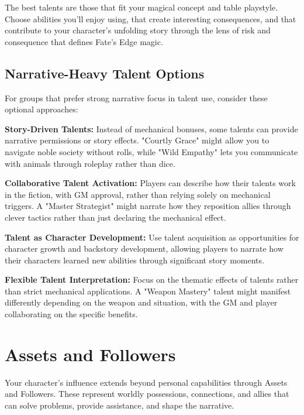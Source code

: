 \documentclass[11pt,twoside,openany]{book}
\begin{document}
\begin{tcolorbox}[colback=gray!5!white, colframe=gray!75!black, title=Final Note, fonttitle=\bfseries]
The best talents are those that fit your magical concept and table playstyle. Choose abilities you'll enjoy using, that create interesting consequences, and that contribute to your character's unfolding story through the lens of risk and consequence that defines Fate's Edge magic.
\end{tcolorbox}

\section*{Narrative-Heavy Talent Options} 

For groups that prefer strong narrative focus in talent use, consider these optional approaches:

\textbf{Story-Driven Talents:} Instead of mechanical bonuses, some talents can provide narrative permissions or story effects. "Courtly Grace" might allow you to navigate noble society without rolls, while "Wild Empathy" lets you communicate with animals through roleplay rather than dice.

\textbf{Collaborative Talent Activation:} Players can describe how their talents work in the fiction, with GM approval, rather than relying solely on mechanical triggers. A "Master Strategist" might narrate how they reposition allies through clever tactics rather than just declaring the mechanical effect.

\textbf{Talent as Character Development:} Use talent acquisition as opportunities for character growth and backstory development, allowing players to narrate how their characters learned new abilities through significant story moments.

\textbf{Flexible Talent Interpretation:} Focus on the thematic effects of talents rather than strict mechanical applications. A "Weapon Mastery" talent might manifest differently depending on the weapon and situation, with the GM and player collaborating on the specific benefits.

\chapter{Assets and Followers} \label{ch:assets}

Your character's influence extends beyond personal capabilities through Assets and Followers. These represent worldly possessions, connections, and allies that can solve problems, provide assistance, and shape the narrative.
\end{document}
